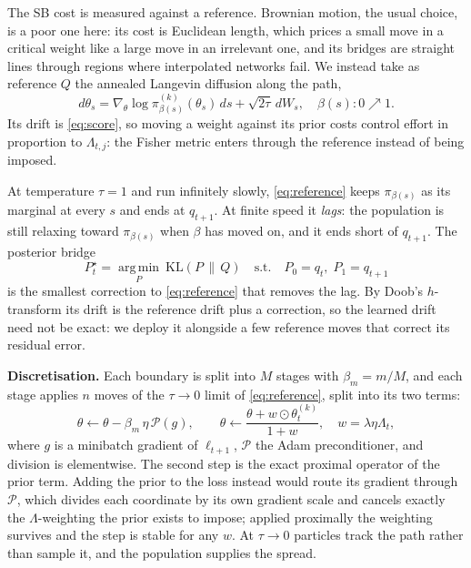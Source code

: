 \documentclass{article}
\newcommand{\KL}{\mathrm{KL}}
\newcommand{\thk}{\theta_t^{(k)}}
\begin{document}
The SB cost is measured against a reference. Brownian motion, the usual choice,
is a poor one here: its cost is Euclidean length, which prices a small move in a
critical weight like a large move in an irrelevant one, and its bridges are
straight lines through regions where interpolated networks fail. We instead take
as reference $Q$ the annealed Langevin diffusion along the path,
\begin{equation}
d\theta_s=\nabla_\theta\log\pi^{(k)}_{\beta(s)}(\theta_s)\,ds+\sqrt{2\tau}\,dW_s,
\quad \beta(s)\colon 0\nearrow1 .
\label{eq:reference}
\end{equation}
Its drift is \eqref{eq:score}, so moving a weight against its prior costs
control effort in proportion to $\Lambda_{t,j}$: the Fisher metric enters through
the reference instead of being imposed.

At temperature $\tau=1$ and run infinitely slowly, \eqref{eq:reference} keeps
$\pi_{\beta(s)}$ as its marginal at every $s$ and ends at $q_{t+1}$. At finite speed it \emph{lags}: the
population is still relaxing toward $\pi_{\beta(s)}$ when $\beta$ has moved on,
and it ends short of $q_{t+1}$. The posterior bridge
\begin{equation}
P^\star_t=\operatorname*{arg\,min}_{P}\ \KL(P\,\|\,Q)
\quad\text{s.t.}\quad P_0=q_t,\;P_1=q_{t+1}
\label{eq:psb}
\end{equation}
is the smallest correction to \eqref{eq:reference} that removes the lag. By
Doob's $h$-transform its drift is the reference drift plus a correction, so the
learned drift need not be exact: we deploy it alongside a few reference moves
that correct its residual error.

\textbf{Discretisation.} Each boundary is split into $M$ stages with
$\beta_m=m/M$, and each stage applies $n$ moves of the $\tau\to0$ limit of
\eqref{eq:reference}, split into its two terms:
\begin{equation}
\theta\leftarrow\theta-\beta_m\,\eta\,\mathcal{P}(g),\qquad
\theta\leftarrow\frac{\theta+w\odot\thk}{1+w},\quad w=\lambda\eta\Lambda_t ,
\label{eq:moves}
\end{equation}
where $g$ is a minibatch gradient of $\ell_{t+1}$, $\mathcal{P}$ the Adam
preconditioner, and division is elementwise. The second step is the exact
proximal operator of the prior term. Adding the prior to the loss instead would
route its gradient through $\mathcal{P}$, which divides each coordinate by its
own gradient scale and cancels exactly the $\Lambda$-weighting the prior exists
to impose; applied proximally the weighting survives and the step is stable for
any $w$. At $\tau\to0$ particles track the path rather than sample it, and the
population supplies the spread.
\end{document}

